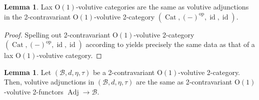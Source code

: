 \documentclass{article}
\newcommand{\opp}{\operatorname{op}}%
\newcommand{\id}{\operatorname{id}}%
\newcommand{\Cat}{\operatorname{Cat}}%
\newcommand{\Adj}{\operatorname{Adj}}%
\newcommand{\Oone}{\operatorname{O(1)}}
\newcommand{\B}{\mathcal{B}}
\numberwithin{equation}{section}
\theoremstyle{definition}
\newtheorem{lemma}[definition]{Lemma}
\theoremstyle{theorem}
\begin{document}
\begin{lemma}\label{Lemma: volutive adjunctions and lax volutive categories}
    Lax $\Oone$-volutive categories are the same as volutive adjunctions in the 2-contravariant $\Oone$-volutive 2-category $(\Cat,(-)^{\opp},\id,\id)$. 
\end{lemma}
\begin{proof}
    Spelling out 2-contravariant $\Oone$-volutive 2-category $(\Cat,(-)^{\opp},\id,\id)$ according to  yields 
    precisely the same data as that of a lax $\Oone$-volutive category. 
\end{proof}
\begin{lemma}\label{Lemma: volutive adjunctions and volutive functors from the walking adjunction}
    Let $(\B,d,\eta,\tau)$ be a 2-contravariant $\Oone$-volutive 2-category. Then, volutive adjunctions in $(\B,d,\eta,\tau)$ are the same as 
    2-contravariant $\Oone$-volutive 2-functors $\Adj \to \B$. 
\end{lemma}
\end{document}
